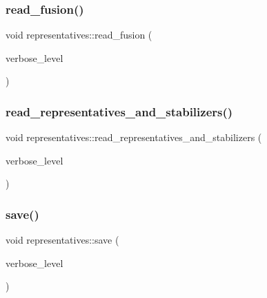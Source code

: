 \subsubsection{\texorpdfstring{read\+\_\+fusion()}{read\_fusion()}}
{\footnotesize\ttfamily void representatives\+::read\+\_\+fusion (\begin{DoxyParamCaption}\item[{\mbox{\hyperlink{galois_8h_a09fddde158a3a20bd2dcadb609de11dc}{I\+NT}}}]{verbose\+\_\+level }\end{DoxyParamCaption})}

\mbox{\label{classrepresentatives_a265f9011bf89e9be28e9627ad127f0f4}} 
\subsubsection{\texorpdfstring{read\+\_\+representatives\+\_\+and\+\_\+stabilizers()}{read\_representatives\_and\_stabilizers()}}
{\footnotesize\ttfamily void representatives\+::read\+\_\+representatives\+\_\+and\+\_\+stabilizers (\begin{DoxyParamCaption}\item[{\mbox{\hyperlink{galois_8h_a09fddde158a3a20bd2dcadb609de11dc}{I\+NT}}}]{verbose\+\_\+level }\end{DoxyParamCaption})}

\mbox{\label{classrepresentatives_a55b82caf4dcd8c5f717ceb448104c95b}} 
\subsubsection{\texorpdfstring{save()}{save()}}
{\footnotesize\ttfamily void representatives\+::save (\begin{DoxyParamCaption}\item[{\mbox{\hyperlink{galois_8h_a09fddde158a3a20bd2dcadb609de11dc}{I\+NT}}}]{verbose\+\_\+level }\end{DoxyParamCaption})}

\mbox{\label{classrepresentatives_a0f72413543cd660254b19cc5a49bfc39}} 

